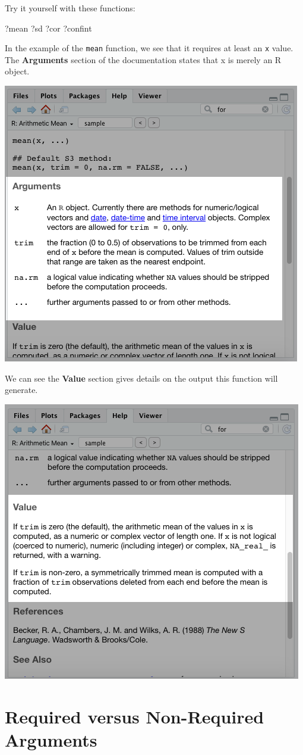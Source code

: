 \documentclass[
]{book}
\newenvironment{Shaded}{\begin{snugshade}}{\end{snugshade}}
\newcommand{\NormalTok}[1]{#1}
\begin{document}
\begin{center}
Try it yourself with these functions:

\begin{Shaded}
\begin{Highlighting}[]
\NormalTok{?mean}
\NormalTok{?sd}
\NormalTok{?cor}
\NormalTok{?confint}
\end{Highlighting}
\end{Shaded}

In the example of the \texttt{mean} function, we see that it requires at least an \texttt{x} value. The \textbf{Arguments} section of the documentation states that x is merely an R object.

\begin{center}\includegraphics[width=0.5\linewidth]{1.48.0_Function_Documentation} \end{center}

We can see the \textbf{Value} section gives details on the output this function will generate.

\begin{center}\includegraphics[width=0.5\linewidth]{1.49_Function_Documentation} \end{center}

\hypertarget{required-versus-non-required-arguments}{%
\section{Required versus Non-Required Arguments}\label{required-versus-non-required-arguments}}


\end{center}
\end{document}
